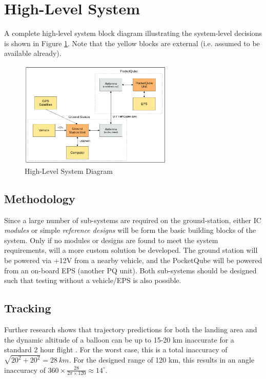 \graphicspath{{./figures}}

\section{High-Level System}
A complete high-level system block diagram illustrating the system-level decisions is shown in Figure \ref{fig:complete_system}. Note that the yellow blocks are external (i.e. assumed to be available already).

\begin{figure}[!htb]
    \centering
    \includegraphics[width=0.65\textwidth]{complete_system.png}
    \caption{High-Level System Diagram}
    \label{fig:complete_system}
  \end{figure}

\subsection{Methodology}
Since a large number of sub-systems are required on the ground-station, either IC \textit{modules} or simple \textit{reference designs} will be form the basic building blocks of the system. Only if no modules or designs are found to meet the system requirements, will a more custom solution be developed. The ground station will be powered via +12V from a nearby vehicle, and the PocketQube will be powered from an on-board EPS (another PQ unit). Both sub-systems should be designed such that testing without a vehicle/EPS is also possible.

\subsection{Tracking}
Further research shows that trajectory predictions for both the landing area and the dynamic altitude of a balloon can be up to 15-20 km inaccurate for a standard 2 hour flight \cite{paper-balloonTrajectoryAnalysis}. For the worst case, this is a total inaccuracy of $\sqrt{20^2 + 20^2} = \SI{28}{km}$. For the designed range of 120 km, this results in an angle inaccuracy of $360 \times \frac{28}{2 \pi \times 120} \approx 14^\circ$.

